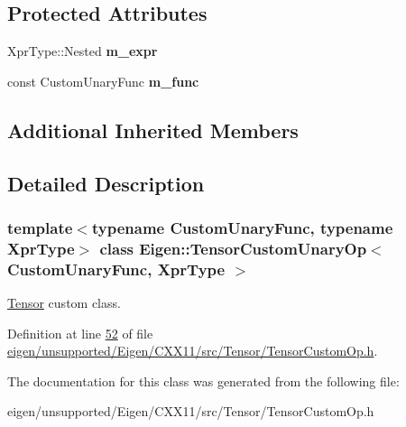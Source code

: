 \subsection*{Protected Attributes}
\begin{DoxyCompactItemize}
\item 
\mbox{\label{class_eigen_1_1_tensor_custom_unary_op_ac1cc3df13ec5d7701268e406f04d5308}} 
Xpr\+Type\+::\+Nested {\bfseries m\+\_\+expr}
\item 
\mbox{\label{class_eigen_1_1_tensor_custom_unary_op_a886505d3cd4378fec18a446e35b85d9b}} 
const Custom\+Unary\+Func {\bfseries m\+\_\+func}
\end{DoxyCompactItemize}
\subsection*{Additional Inherited Members}


\subsection{Detailed Description}
\subsubsection*{template$<$typename Custom\+Unary\+Func, typename Xpr\+Type$>$\newline
class Eigen\+::\+Tensor\+Custom\+Unary\+Op$<$ Custom\+Unary\+Func, Xpr\+Type $>$}

\hyperlink{class_eigen_1_1_tensor}{Tensor} custom class. 

Definition at line \hyperlink{eigen_2unsupported_2_eigen_2_c_x_x11_2src_2_tensor_2_tensor_custom_op_8h_source_l00052}{52} of file \hyperlink{eigen_2unsupported_2_eigen_2_c_x_x11_2src_2_tensor_2_tensor_custom_op_8h_source}{eigen/unsupported/\+Eigen/\+C\+X\+X11/src/\+Tensor/\+Tensor\+Custom\+Op.\+h}.



The documentation for this class was generated from the following file\+:\begin{DoxyCompactItemize}
\item 
eigen/unsupported/\+Eigen/\+C\+X\+X11/src/\+Tensor/\+Tensor\+Custom\+Op.\+h\end{DoxyCompactItemize}
